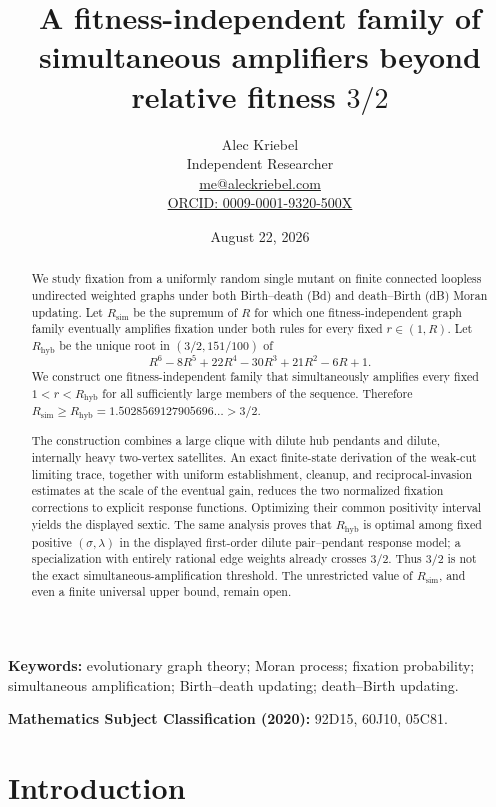 \documentclass[11pt]{article}
\title{A fitness-independent family of simultaneous amplifiers beyond relative fitness $3/2$}
\author{Alec Kriebel\\
Independent Researcher\\
\href{mailto:me@aleckriebel.com}{me@aleckriebel.com}\\
\href{https://orcid.org/0009-0001-9320-500X}{ORCID: 0009-0001-9320-500X}}
\date{August 22, 2026}
\theoremstyle{definition}
\theoremstyle{remark}
\newcommand{\Rsim}{R_{\mathrm{sim}}}
\newcommand{\Rhyb}{R_{\mathrm{hyb}}}
\begin{document}
\maketitle

\begin{abstract}
We study fixation from a uniformly random single mutant on finite connected
loopless undirected weighted graphs under both Birth--death (Bd) and
death--Birth (dB) Moran updating.  Let $\Rsim$ be the supremum of $R$
for which one fitness-independent graph family eventually amplifies fixation
under both rules for every fixed $r\in(1,R)$.  Let $\Rhyb$ be
the unique root in $(3/2,151/100)$ of
\[
 R^6-8R^5+22R^4-30R^3+21R^2-6R+1.
\]
We construct one fitness-independent family that simultaneously amplifies
every fixed $1<r<\Rhyb$ for all sufficiently large members of the sequence.
Therefore
$\Rsim\geq\Rhyb=1.5028569127905696\ldots>3/2$.

The construction combines a large clique with dilute hub pendants and
dilute, internally heavy two-vertex satellites.  An exact finite-state
derivation of the weak-cut limiting trace, together with uniform establishment, cleanup, and
reciprocal-invasion estimates at the scale of the eventual gain, reduces the two
normalized fixation corrections to explicit response functions.  Optimizing
their common positivity interval yields the displayed sextic.  The same
analysis proves that $\Rhyb$ is optimal among fixed positive
$(\sigma,\lambda)$ in the displayed first-order dilute pair--pendant response
model; a specialization with entirely rational edge weights already crosses
$3/2$.  Thus $3/2$ is not the exact simultaneous-amplification threshold.
The unrestricted value of $\Rsim$, and even a finite universal upper bound,
remain open.
\end{abstract}

\noindent\textbf{Keywords:} evolutionary graph theory; Moran process;
fixation probability; simultaneous amplification; Birth--death updating;
death--Birth updating.

\medskip
\noindent\textbf{Mathematics Subject Classification (2020):}
92D15, 60J10, 05C81.

\section{Introduction}
\end{document}

